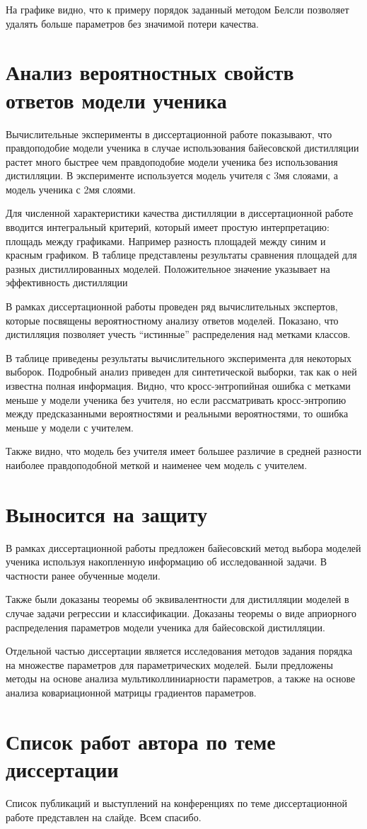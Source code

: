\documentclass[10pt, twoside]{article}
\begin{document}
На графике видно, что к примеру порядок заданный методом Белсли позволяет удалять больше параметров без значимой потери качества.

\section{Анализ вероятностных свойств ответов модели ученика}
Вычислительные эксперименты в диссертационной работе показывают, что правдоподобие модели ученика в случае использования байесовской дистилляции растет много быстрее чем правдоподобие модели ученика без использования дистилляции. В эксперименте используется модель учителя с 3мя слояами, а модель ученика с 2мя слоями.

Для численной характеристики качества дистилляции в диссертационной работе вводится интегральный критерий, который имеет простую интерпретацию: площадь между графиками. Например разность площадей между синим и красным графиком. В таблице представлены результаты сравнения площадей для разных дистиллированных моделей. Положительное значение указывает на эффективность дистилляции

В рамках диссертационной работы проведен ряд вычислительных экспертов, которые посвящены вероятностному анализу ответов моделей. Показано, что дистилляция позволяет учесть ``истинные'' распределения над метками классов.

В таблице приведены результаты вычислительного эксперимента для некоторых выборок. Подробный анализ приведен для синтетической выборки, так как о ней известна полная информация. Видно, что кросс-энтропийная ошибка с метками меньше у модели ученика без учителя, но если рассматривать кросс-энтропию между предсказанными вероятностями и реальными вероятностями, то ошибка меньше у модели с учителем.

Также видно, что модель без учителя имеет большее различие в средней разности наиболее правдоподобной меткой и наименее чем модель с учителем.

\section{Выносится на защиту}
В рамках диссертационной работы предложен байесовский метод выбора моделей ученика используя накопленную информацию об исследованной задачи. В частности ранее обученные модели.

Также были доказаны теоремы об эквивалентности для дистилляции моделей в случае задачи регрессии и классификации. Доказаны теоремы о виде априорного распределения параметров модели ученика для байесовской дистилляции.

Отдельной частью диссертации является исследования методов задания порядка на множестве параметров для параметрических моделей. Были предложены методы на основе анализа мультиколлиниарности параметров, а также на основе анализа ковариационной матрицы градиентов параметров.

\section{Список работ автора по теме диссертации}
Список публикаций и выступлений на конференциях по теме диссертационной работе представлен на слайде. Всем спасибо.
\end{document}

